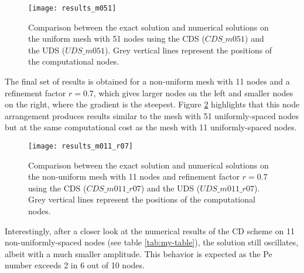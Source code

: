 \documentclass[12pt]{article}
\begin{document}
\begin{figure}
    \centering
    \texttt{[image: results\_m051]}
    \caption{Comparison between the exact solution and numerical solutions on the uniform mesh with 51 nodes using the CDS ($CDS\_m051$) and the UDS ($UDS\_m051$). Grey vertical lines represent the positions of the computational nodes.}
    \label{fig:second}
\end{figure}

The final set of results is obtained for a non-uniform mesh with 11 nodes and a refinement factor $r = 0.7$, which gives larger nodes on the left and smaller nodes on the right, where the gradient is the steepest. Figure \ref{fig:third} highlights that this node arrangement produces results similar to the mesh with 51 uniformly-spaced nodes but at the same computational cost as the mesh with 11 uniformly-spaced nodes.

\begin{figure}
    \centering
    \texttt{[image: results\_m011\_r07]}
    \caption{Comparison between the exact solution and numerical solutions on the non-uniform mesh with 11 nodes and refinement factor $r = 0.7$ using the CDS ($CDS\_m011\_r07$) and the UDS ($UDS\_m011\_r07$). Grey vertical lines represent the positions of the computational nodes.}
    \label{fig:third}
\end{figure}

Interestingly, after a closer look at the numerical results of the CD scheme on 11 non-uniformly-spaced nodes (see table \ref{tab:my-table}), the solution still oscillates, albeit with a much smaller amplitude. This behavior is expected as the Pe number exceeds 2 in 6 out of 10 nodes.
\end{document}
